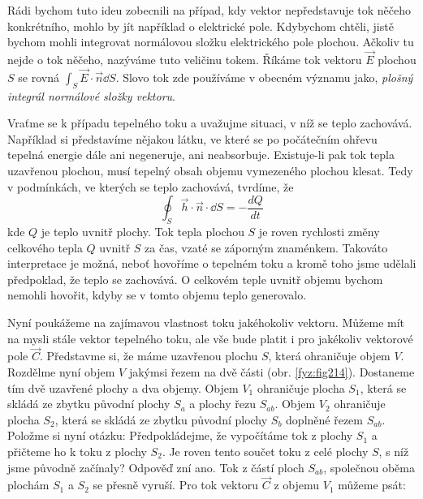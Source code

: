{    Rádi bychom tuto ideu zobecnili na případ, kdy vektor nepředstavuje tok něčeho konkrétního, 
    mohlo by jít například o elektrické pole. Kdybychom chtěli, jistě bychom mohli integrovat 
    normálovou složku elektrického pole plochou. Ačkoliv tu nejde o tok něčeho, nazýváme tuto 
    veličinu tokem. Říkáme tok vektoru $\vec{E}$ plochou \(S\) se rovná 
    \(\int_S\vec{E}\cdot\vec{n}\dd{S}\). Slovo tok zde používáme v obecném významu jako, 
    \emph{plošný integrál normálové složky vektoru}.      
    
    Vraťme se k případu tepelného toku a uvažujme situaci, v níž se teplo zachovává. Například si
    představíme nějakou látku, ve které se po počátečním ohřevu tepelná energie dále ani 
    negeneruje, ani neabsorbuje. Existuje-li pak tok tepla uzavřenou plochou, musí tepelný obsah 
    objemu vymezeného plochou klesat. Tedy v podmínkách, ve kterých se teplo zachovává, tvrdíme, že
    \begin{equation}\label{fyz:eq_int_fey_dQ}
      \oint_S\vec{h}\cdot\vec{n}\cdot\dd{S} = - \frac{dQ}{dt}
    \end{equation}
    kde $Q$ je teplo uvnitř plochy. Tok tepla plochou $S$ je roven rychlosti změny celkového tepla 
    $Q$ uvnitř $S$ za čas, vzaté se záporným znaménkem. Takováto interpretace je možná, neboť 
    hovoříme o tepelném toku a kromě toho jsme udělali předpoklad, že teplo se zachovává. O 
    celkovém teple uvnitř objemu bychom nemohli hovořit, kdyby se v tomto objemu teplo generovalo.
    
    Nyní poukážeme na zajímavou vlastnost toku jakéhokoliv vektoru. Můžeme mít na mysli stále 
    vektor tepelného toku, ale vše bude platit i pro jakékoliv vektorové pole $\vec{C}$. Představme 
    si, že máme uzavřenou plochu $S$, která ohraničuje objem $V$. Rozdělme nyní objem $V$ jakýmsi 
    řezem na dvě části (obr. \ref{fyz:fig214}). Dostaneme tím dvě uzavřené plochy a dva objemy. 
    Objem $V_1$ ohraničuje plocha $S_1$, která se skládá ze zbytku původní plochy $S_a$ a plochy 
    řezu $S_{ab}$. Objem $V_2$ ohraničuje plocha $S_2$, která se skládá ze zbytku původní plochy 
    $S_b$ doplněné řezem $S_{ab}$. Položme si nyní otázku: Předpokládejme, že vypočítáme tok z 
    plochy $S_1$ a přičteme ho k toku z plochy $S_2$. Je roven tento součet toku z celé plochy $S$, 
    s níž jsme původně začínaly? Odpověď zní ano. Tok z částí ploch $S_{ab}$, společnou oběma 
    plochám $S_1$ a $S_2$ se přesně vyruší. Pro tok vektoru $\vec{C}$ z objemu $V_1$ můžeme psát:
    
}
